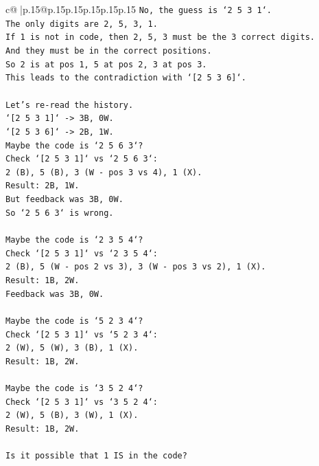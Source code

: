 \documentclass{article}
\begin{document}
{\begin{supertabular}{c@{$\;$}|p{.15\linewidth}@{}p{.15\linewidth}p{.15\linewidth}p{.15\linewidth}p{.15\linewidth}p{.15\linewidth}}
{{{\texttt{No, the guess is `2 5 3 1`.} \\
\texttt{The only digits are 2, 5, 3, 1.} \\
\texttt{If 1 is not in code, then 2, 5, 3 must be the 3 correct digits.} \\
\texttt{And they must be in the correct positions.} \\
\texttt{So 2 is at pos 1, 5 at pos 2, 3 at pos 3.} \\
\texttt{This leads to the contradiction with `{[}2 5 3 6{]}`.} \\
\\ 
\texttt{Let's re{-}read the history.} \\
\texttt{`{[}2 5 3 1{]}` {-}> 3B, 0W.} \\
\texttt{`{[}2 5 3 6{]}` {-}> 2B, 1W.} \\
\texttt{Maybe the code is `2 5 6 3`?} \\
\texttt{Check `{[}2 5 3 1{]}` vs `2 5 6 3`:} \\
\texttt{2 (B), 5 (B), 3 (W {-} pos 3 vs 4), 1 (X).} \\
\texttt{Result: 2B, 1W.} \\
\texttt{But feedback was 3B, 0W.} \\
\texttt{So `2 5 6 3` is wrong.} \\
\\ 
\texttt{Maybe the code is `2 3 5 4`?} \\
\texttt{Check `{[}2 5 3 1{]}` vs `2 3 5 4`:} \\
\texttt{2 (B), 5 (W {-} pos 2 vs 3), 3 (W {-} pos 3 vs 2), 1 (X).} \\
\texttt{Result: 1B, 2W.} \\
\texttt{Feedback was 3B, 0W.} \\
\\ 
\texttt{Maybe the code is `5 2 3 4`?} \\
\texttt{Check `{[}2 5 3 1{]}` vs `5 2 3 4`:} \\
\texttt{2 (W), 5 (W), 3 (B), 1 (X).} \\
\texttt{Result: 1B, 2W.} \\
\\ 
\texttt{Maybe the code is `3 5 2 4`?} \\
\texttt{Check `{[}2 5 3 1{]}` vs `3 5 2 4`:} \\
\texttt{2 (W), 5 (B), 3 (W), 1 (X).} \\
\texttt{Result: 1B, 2W.} \\
\\ 
\texttt{Is it possible that 1 IS in the code?} \\
}}}
\end{supertabular}}
\end{document}
